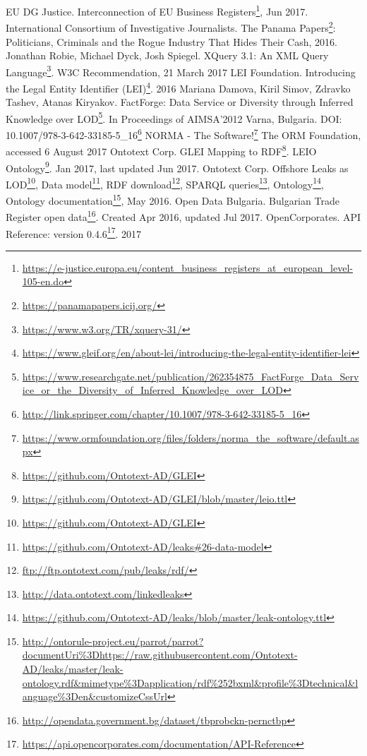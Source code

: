 \documentclass[runningheads,a4paper]{llncs}
\begin{document}
\begin{thebibliography}{4}
 EU DG Justice. Interconnection of EU Business Registers\footnote{\url{https://e-justice.europa.eu/content_business_registers_at_european_level-105-en.do}}, Jun 2017.
 International Consortium of Investigative Journalists. The Panama Papers\footnote{\url{https://panamapapers.icij.org/}}: Politicians, Criminals and the Rogue Industry That Hides Their Cash, 2016.
 Jonathan Robie, Michael Dyck, Josh Spiegel. XQuery 3.1: An XML Query Language\footnote{\url{https://www.w3.org/TR/xquery-31/}}. W3C Recommendation, 21 March 2017 
 LEI Foundation. Introducing the Legal Entity Identifier (LEI)\footnote{\url{https://www.gleif.org/en/about-lei/introducing-the-legal-entity-identifier-lei}}. 2016
 Mariana Damova, Kiril Simov, Zdravko Tashev, Atanas Kiryakov. FactForge: Data Service or Diversity through Inferred Knowledge over LOD\footnote{\url{https://www.researchgate.net/publication/262354875_FactForge_Data_Service_or_the_Diversity_of_Inferred_Knowledge_over_LOD}}. In Proceedings of AIMSA'2012 Varna, Bulgaria. DOI: 10.1007/978-3-642-33185-5\_16\footnote{\url{http://link.springer.com/chapter/10.1007/978-3-642-33185-5_16}}
 NORMA - The Software!\footnote{\url{https://www.ormfoundation.org/files/folders/norma_the_software/default.aspx}} The ORM Foundation, accessed 6 August 2017
 Ontotext Corp. GLEI Mapping to RDF\footnote{\url{https://github.com/Ontotext-AD/GLEI}}. LEIO Ontology\footnote{\url{https://github.com/Ontotext-AD/GLEI/blob/master/leio.ttl}}. Jan 2017, last updated Jun 2017.
 Ontotext Corp. Offshore Leaks as LOD\footnote{\url{https://github.com/Ontotext-AD/GLEI}}, Data model\footnote{\url{https://github.com/Ontotext-AD/leaks#26-data-model}}, RDF download\footnote{\url{ftp://ftp.ontotext.com/pub/leaks/rdf/}}, SPARQL queries\footnote{\url{http://data.ontotext.com/linkedleaks}}, Ontology\footnote{\url{https://github.com/Ontotext-AD/leaks/blob/master/leak-ontology.ttl}}, Ontology documentation\footnote{\url{http://ontorule-project.eu/parrot/parrot?documentUri%3Dhttps://raw.githubusercontent.com/Ontotext-AD/leaks/master/leak-ontology.rdf&mimetype%3Dapplication/rdf%252bxml&profile%3Dtechnical&language%3Den&customizeCssUrl}}, May 2016.
 Open Data Bulgaria. Bulgarian Trade Register open data\footnote{\url{http://opendata.government.bg/dataset/tbprobckn-pernctbp}}. Created Apr 2016, updated Jul 2017.
 OpenCorporates. API Reference: version 0.4.6\footnote{\url{https://api.opencorporates.com/documentation/API-Reference}}. 2017 

\end{thebibliography}
\end{document}

